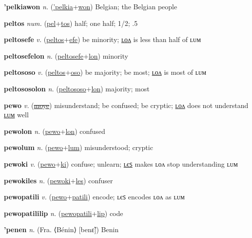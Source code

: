 \textbf{\hypertarget{'pelkiawon}{'pelkiawon}} \textit{n.} (\hyperlink{'pelkia}{'pelkia}+\allowbreak \hyperlink{won}{won})
Belgian; the Belgian people

\textbf{\hypertarget{peltos}{peltos}} \textit{num.} (\hyperlink{pel}{pel}+\allowbreak \hyperlink{tos}{tos})
half; one half; 1/2; .5

\textbf{\hypertarget{peltosefe}{peltosefe}} \textit{v.} (\hyperlink{peltos}{peltos}+\allowbreak \hyperlink{efe}{efe})
be minority; \hyperlink{peltosefelon}{ʟᴏᴧ} is less than half of ʟᴜᴍ

\textbf{\hypertarget{peltosefelon}{peltosefelon}} \textit{n.} (\hyperlink{peltosefe}{peltosefe}+\allowbreak \hyperlink{lon}{lon})
minority

\textbf{\hypertarget{peltososo}{peltososo}} \textit{v.} (\hyperlink{peltos}{peltos}+\allowbreak \hyperlink{oso}{oso})
be majority; be most; \hyperlink{peltososolon}{ʟᴏᴧ} is most of ʟᴜᴍ

\textbf{\hypertarget{peltososolon}{peltososolon}} \textit{n.} (\hyperlink{peltososo}{peltososo}+\allowbreak \hyperlink{lon}{lon})
majority; most

\textbf{\hypertarget{pewo}{pewo}} \textit{v.} (\hyperlink{moye}{\sout{moye}})
misunderstand; be confused; be cryptic; \hyperlink{pewolon}{ʟᴏᴧ} does not understand \hyperlink{pewolum}{ʟᴜᴍ} well

\textbf{\hypertarget{pewolon}{pewolon}} \textit{n.} (\hyperlink{pewo}{pewo}+\allowbreak \hyperlink{lon}{lon})
confused

\textbf{\hypertarget{pewolum}{pewolum}} \textit{n.} (\hyperlink{pewo}{pewo}+\allowbreak \hyperlink{lum}{lum})
misunderstood; cryptic

\textbf{\hypertarget{pewoki}{pewoki}} \textit{v.} (\hyperlink{pewo}{pewo}+\allowbreak \hyperlink{ki}{ki})
confuse; unlearn; \hyperlink{pewokiles}{ʟєꜱ} makes ʟᴏᴧ stop understanding ʟᴜᴍ

\textbf{\hypertarget{pewokiles}{pewokiles}} \textit{n.} (\hyperlink{pewoki}{pewoki}+\allowbreak \hyperlink{les}{les})
confuser

\textbf{\hypertarget{pewopatili}{pewopatili}} \textit{v.} (\hyperlink{pewo}{pewo}+\allowbreak \hyperlink{patili}{patili})
encode; ʟєꜱ encodes ʟᴏᴧ as ʟᴜᴍ

\textbf{\hypertarget{pewopatililip}{pewopatililip}} \textit{n.} (\hyperlink{pewopatili}{pewopatili}+\allowbreak \hyperlink{lip}{lip})
code

\textbf{\hypertarget{'penen}{'penen}} \textit{n.} (Fra. ⟨Bénin⟩ [benɛ̃])
Benin

